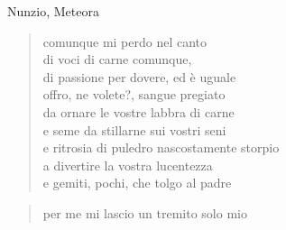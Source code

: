 \clearpage


\begin{artItem}
	Nunzio, Meteora
\end{artItem}

	\begin{verse}
		comunque mi perdo nel canto\\
		di voci di carne comunque,\\
		di passione per dovere, ed è uguale\\
		offro, ne volete?, sangue pregiato\\
		da ornare le vostre labbra di carne\\
		e seme da stillarne sui vostri seni\\
		e ritrosia di puledro nascostamente storpio\\
		a divertire la vostra lucentezza\\
		e gemiti, pochi, che tolgo al padre
	\end{verse}

	\begin{verse}
		per me mi lascio un tremito solo mio
	\end{verse}
